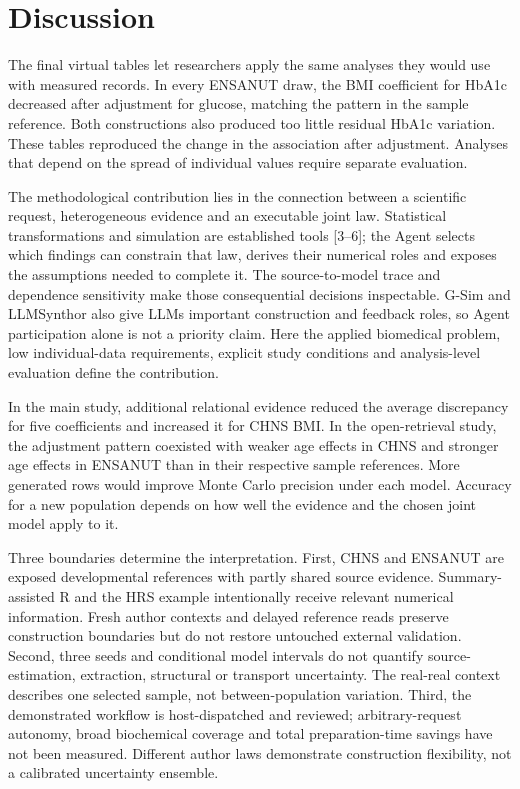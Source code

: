 \documentclass[10pt,twocolumn]{article}
\begin{document}
\section{Discussion}

The final virtual tables let researchers apply the same analyses they would use with measured records. In every ENSANUT draw, the BMI coefficient for HbA1c decreased after adjustment for glucose, matching the pattern in the sample reference. Both constructions also produced too little residual HbA1c variation. These tables reproduced the change in the association after adjustment. Analyses that depend on the spread of individual values require separate evaluation.


The methodological contribution lies in the connection between a scientific request, heterogeneous evidence and an executable joint law. Statistical transformations and simulation are established tools [3–6]; the Agent selects which findings can constrain that law, derives their numerical roles and exposes the assumptions needed to complete it. The source-to-model trace and dependence sensitivity make those consequential decisions inspectable. G-Sim and LLMSynthor also give LLMs important construction and feedback roles, so Agent participation alone is not a priority claim. Here the applied biomedical problem, low individual-data requirements, explicit study conditions and analysis-level evaluation define the contribution.


In the main study, additional relational evidence reduced the average discrepancy for five coefficients and increased it for CHNS BMI. In the open-retrieval study, the adjustment pattern coexisted with weaker age effects in CHNS and stronger age effects in ENSANUT than in their respective sample references. More generated rows would improve Monte Carlo precision under each model. Accuracy for a new population depends on how well the evidence and the chosen joint model apply to it.


Three boundaries determine the interpretation. First, CHNS and ENSANUT are exposed developmental references with partly shared source evidence. Summary-assisted R and the HRS example intentionally receive relevant numerical information. Fresh author contexts and delayed reference reads preserve construction boundaries but do not restore untouched external validation. Second, three seeds and conditional model intervals do not quantify source-estimation, extraction, structural or transport uncertainty. The real-real context describes one selected sample, not between-population variation. Third, the demonstrated workflow is host-dispatched and reviewed; arbitrary-request autonomy, broad biochemical coverage and total preparation-time savings have not been measured. Different author laws demonstrate construction flexibility, not a calibrated uncertainty ensemble.
\end{document}
